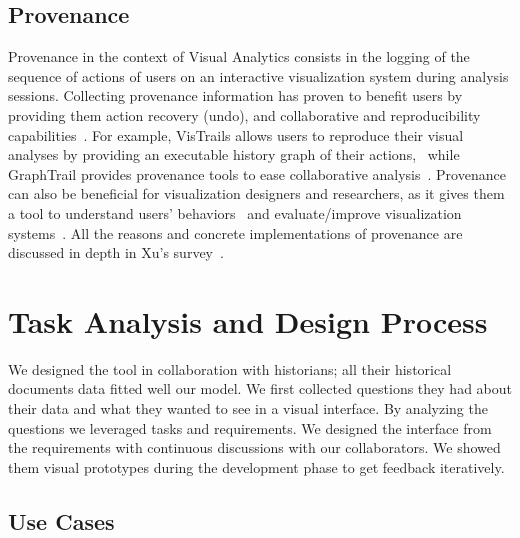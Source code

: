 \subsection{Provenance}

Provenance in the context of Visual Analytics consists in the logging of the sequence of actions of users on an interactive visualization system during analysis sessions. Collecting provenance information has proven to benefit users by providing them action recovery (undo), and collaborative and reproducibility capabilities~\cite{raganCharacterizingProvenanceVisualization2016}. For example, VisTrails allows users to reproduce their visual analyses by providing an executable history graph of their actions,~\cite{callahanVisTrailsVisualizationMeets2006} while GraphTrail provides provenance tools to ease collaborative analysis~\cite{dunneGraphTrailAnalyzingLarge2012}.
Provenance can also be beneficial for visualization designers and researchers, as it gives them a tool to understand users' behaviors~\cite{battleCharacterizingExploratoryVisual2019, borsProvenanceTaskAbstraction2019}
and evaluate/improve visualization systems~\cite{renCharticulatorInteractiveConstruction2019}.
All the reasons and concrete implementations of provenance are discussed in depth in Xu's survey~\cite{xuSurveyAnalysisUser2020}.





\section{Task Analysis and Design Process}\label{sec:tasks}

We designed the \name tool in collaboration with historians; all their historical documents data fitted well our \model model.
We first collected questions they had about their data and what they wanted to see in a visual interface.
By analyzing the questions we leveraged tasks and requirements.
We designed the interface from the requirements with continuous discussions with our collaborators.
We showed them visual prototypes during the development phase to get feedback iteratively.

\subsection{Use Cases}

